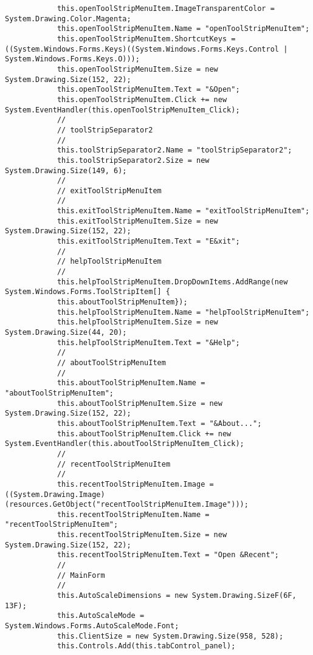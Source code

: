 \begin{scriptsize}
\begin{verbatim}
            this.openToolStripMenuItem.ImageTransparentColor = System.Drawing.Color.Magenta;
            this.openToolStripMenuItem.Name = "openToolStripMenuItem";
            this.openToolStripMenuItem.ShortcutKeys = ((System.Windows.Forms.Keys)((System.Windows.Forms.Keys.Control | System.Windows.Forms.Keys.O)));
            this.openToolStripMenuItem.Size = new System.Drawing.Size(152, 22);
            this.openToolStripMenuItem.Text = "&Open";
            this.openToolStripMenuItem.Click += new System.EventHandler(this.openToolStripMenuItem_Click);
            // 
            // toolStripSeparator2
            // 
            this.toolStripSeparator2.Name = "toolStripSeparator2";
            this.toolStripSeparator2.Size = new System.Drawing.Size(149, 6);
            // 
            // exitToolStripMenuItem
            // 
            this.exitToolStripMenuItem.Name = "exitToolStripMenuItem";
            this.exitToolStripMenuItem.Size = new System.Drawing.Size(152, 22);
            this.exitToolStripMenuItem.Text = "E&xit";
            // 
            // helpToolStripMenuItem
            // 
            this.helpToolStripMenuItem.DropDownItems.AddRange(new System.Windows.Forms.ToolStripItem[] {
            this.aboutToolStripMenuItem});
            this.helpToolStripMenuItem.Name = "helpToolStripMenuItem";
            this.helpToolStripMenuItem.Size = new System.Drawing.Size(44, 20);
            this.helpToolStripMenuItem.Text = "&Help";
            // 
            // aboutToolStripMenuItem
            // 
            this.aboutToolStripMenuItem.Name = "aboutToolStripMenuItem";
            this.aboutToolStripMenuItem.Size = new System.Drawing.Size(152, 22);
            this.aboutToolStripMenuItem.Text = "&About...";
            this.aboutToolStripMenuItem.Click += new System.EventHandler(this.aboutToolStripMenuItem_Click);
            // 
            // recentToolStripMenuItem
            // 
            this.recentToolStripMenuItem.Image = ((System.Drawing.Image)(resources.GetObject("recentToolStripMenuItem.Image")));
            this.recentToolStripMenuItem.Name = "recentToolStripMenuItem";
            this.recentToolStripMenuItem.Size = new System.Drawing.Size(152, 22);
            this.recentToolStripMenuItem.Text = "Open &Recent";
            // 
            // MainForm
            // 
            this.AutoScaleDimensions = new System.Drawing.SizeF(6F, 13F);
            this.AutoScaleMode = System.Windows.Forms.AutoScaleMode.Font;
            this.ClientSize = new System.Drawing.Size(958, 528);
            this.Controls.Add(this.tabControl_panel);

\end{verbatim}
\end{scriptsize}
